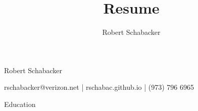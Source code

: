 \documentclass{article}
\title{Resume}
\author{Robert Schabacker}
\begin{document}
{%
\centering
{\Huge Robert Schabacker\par}
\vspace{1em}
{\Large rschabacker@verizon.net  |  rschabac.github.io  |  (973) 796 6965\par}
}
\vspace{3em}
\large
{\LARGE Education\par
\vspace{-0.85em}
\hrulefill}
\vspace{1em}
\end{document}
